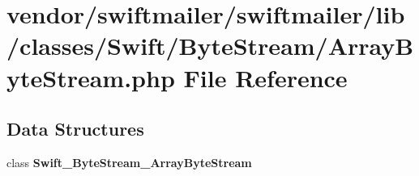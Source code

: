 \section{vendor/swiftmailer/swiftmailer/lib/classes/\+Swift/\+Byte\+Stream/\+Array\+Byte\+Stream.php File Reference}
\label{_array_byte_stream_8php}
\subsection*{Data Structures}
\begin{DoxyCompactItemize}
\item 
class {\bf Swift\+\_\+\+Byte\+Stream\+\_\+\+Array\+Byte\+Stream}
\end{DoxyCompactItemize}
